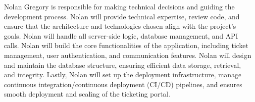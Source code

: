\documentclass[oneside,openany,obeyspaces]{book}
\newcommand\tab[1][1cm]{\hspace*{#1}}
\begin{document}
\begin{flushleft}
    \tab Nolan Gregory is responsible for making technical decisions and guiding the development process. Nolan will provide technical expertise, review code, and ensure that the architecture and technologies chosen align with the project's goals. Nolan will handle all server-side logic, database management, and API calls. Nolan will build the core functionalities of the application, including ticket management, user authentication, and communication features. Nolan will design and maintain the database structure, ensuring efficient data storage, retrieval, and integrity. Lastly, Nolan will set up the deployment infrastructure, manage continuous integration/continuous deployment (CI/CD) pipelines, and ensures smooth deployment and scaling of the ticketing portal.\\~\\


\end{flushleft}
\end{document}
